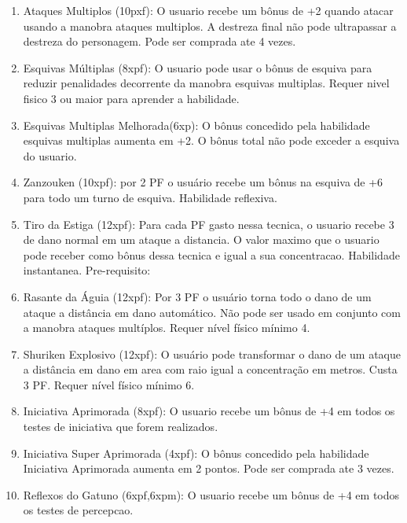 \begin{enumerate}
	\item Ataques Multiplos (10pxf): O usuario recebe um bônus de +2 quando atacar usando a manobra ataques multiplos. A destreza final não pode ultrapassar a destreza do personagem. Pode ser comprada ate 4 vezes. 
	
	\item Esquivas Múltiplas (8xpf): O usuario pode usar o bônus de esquiva para reduzir penalidades decorrente da manobra esquivas multiplas. Requer nivel fisico 3 ou maior para aprender a habilidade.	

	\item Esquivas Multiplas Melhorada(6xp): O bônus concedido pela habilidade esquivas multiplas aumenta em +2. O bônus total não pode exceder a esquiva do usuario.
	
	\item Zanzouken (10xpf): por 2 PF o usuário recebe um bônus na esquiva de +6 para todo um turno de esquiva. Habilidade reflexiva.

	\item Tiro da Estiga (12xpf): Para cada PF gasto nessa tecnica, o usuario recebe 3 de dano normal em um ataque a distancia. O valor maximo que o usuario pode receber como bônus dessa tecnica e igual a sua concentracao. Habilidade instantanea. Pre-requisito: 

	\item Rasante da Águia (12xpf): Por 3 PF o usuário torna todo o dano de um ataque a distância em dano automático. Não pode ser usado em conjunto com a manobra ataques multíplos. Requer nível físico mínimo 4.
	
	\item Shuriken Explosivo (12xpf): O usuário pode transformar o dano de um ataque a distância em dano em area com raio igual a concentração em metros. Custa 3 PF. Requer nível físico mínimo 6.	

	\item Iniciativa Aprimorada (8xpf): O usuario recebe um bônus de +4 em todos os testes de iniciativa que forem realizados.

	\item Iniciativa Super Aprimorada (4xpf): O bônus concedido pela habilidade Iniciativa Aprimorada aumenta em 2 pontos. Pode ser comprada ate 3 vezes.

	\item Reflexos do Gatuno (6xpf,6xpm): O usuario recebe um bônus de +4 em todos os testes de percepcao.


\end{enumerate}
